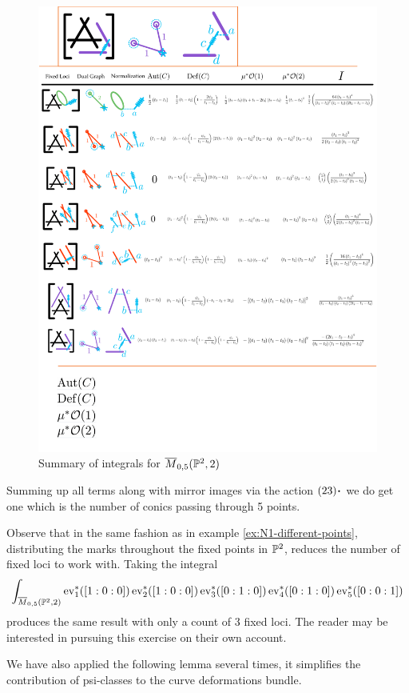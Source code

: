 \documentclass[12pt]{memoir}
\begin{document}
\begin{Ex}
\begin{figure}[h!]
        \includegraphics[width=1\textwidth, trim= 0.1cm 6cm 0.1cm 4.1cm,clip]{../figs/FigsDNnotability4.pdf}
        \caption{Summary of integrals for $\overline{M}_{0,5}(\mathbb{P}^2,2)$}
        \label{fig:summary-table-M05P22}
    \end{figure}
    Summing up all terms along with mirror images via the action $(23)\.$ we do get one which is the number of conics passing through 5 points.
\end{Ex}
Observe that in the same fashion as in example \ref{ex:N1-different-points}, distributing the marks throughout the fixed points in $\mathbb{P}^2$, reduces the number of fixed loci to work with. Taking the integral 
$$\int_{\overline{M}_{0,5}(\mathbb{P}^2,2)}\operatorname{ev}_1^\ast([1:0:0])\operatorname{ev}_2^\ast([1:0:0])\operatorname{ev}_3^\ast([0:1:0])\operatorname{ev}_4^\ast([0:1:0])\operatorname{ev}_5^\ast([0:0:1])$$
produces the same result with only a count of 3 fixed loci. The reader may be interested in pursuing this exercise on their own account.\par
We have also applied the following lemma several times, it simplifies the contribution of psi-classes to the curve deformations bundle.
\end{document}
